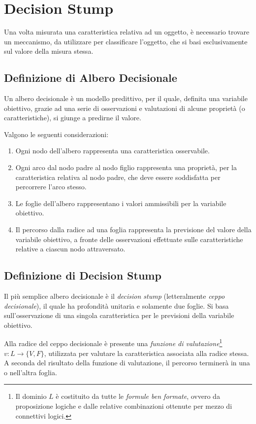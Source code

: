     \section{Decision Stump}
    \label{sec:decision_stump}
        Una volta misurata una caratteristica relativa ad un oggetto, è necessario trovare un meccanismo, da utilizzare per classificare l'oggetto, che si basi esclusivamente sul valore della misura stessa.        

        \subsection{Definizione di Albero Decisionale}
        Un albero decisionale è un modello predittivo, per il quale, definita una variabile obiettivo, grazie ad una serie di osservazioni e valutazioni di alcune proprietà (o caratteristiche), si giunge a predirne il valore.

        Valgono le seguenti considerazioni:
        \begin{enumerate}
            \item Ogni nodo dell'albero rappresenta una caratteristica osservabile.
            \item Ogni arco dal nodo padre al nodo figlio rappresenta una proprietà, per la caratteristica relativa al nodo padre, che deve essere soddisfatta per percorrere l'arco stesso.
            \item Le foglie dell'albero rappresentano i valori ammissibili per la variabile obiettivo.
            \item Il percorso dalla radice ad una foglia rappresenta la previsione del valore della variabile obiettivo, a fronte delle osservazioni effettuate sulle caratteristiche relative a ciascun nodo attraversato.
        \end{enumerate}

        \subsection{Definizione di Decision Stump}
            Il più semplice albero decisionale è il \emph{decision stump} (letteralmente \emph{ceppo decisionale}), il quale ha profondità unitaria e solamente due foglie.
            Si basa sull'osservazione di una singola caratteristica per le previsioni della variabile obiettivo.


            Alla radice del ceppo decisionale è presente una \emph{funzione di valutazione}\footnote{Il dominio $L$ è costituito da tutte le \emph{formule ben formate}, ovvero da proposizione logiche e dalle relative combinazioni ottenute per mezzo di connettivi logici.} $v:L \rightarrow \{V, F\}$, utilizzata per valutare la caratteristica associata alla radice stessa.
            A seconda del risultato della funzione di valutazione, il percorso terminerà in una o nell'altra foglia.

